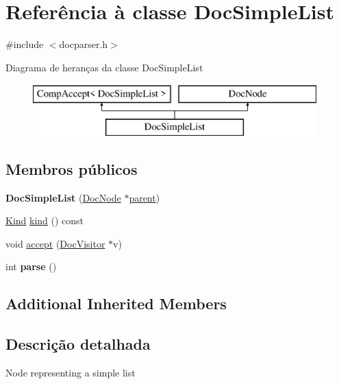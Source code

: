 \hypertarget{class_doc_simple_list}{\section{Referência à classe Doc\-Simple\-List}
\label{class_doc_simple_list}
}


{\ttfamily \#include $<$docparser.\-h$>$}

Diagrama de heranças da classe Doc\-Simple\-List\begin{figure}[H]
\begin{center}
\leavevmode
\includegraphics[height=2.000000cm]{class_doc_simple_list}
\end{center}
\end{figure}
\subsection*{Membros públicos}
\begin{DoxyCompactItemize}
\item 
\hypertarget{class_doc_simple_list_aad6ef0004fe01a0c5b70711f1f0f8701}{{\bfseries Doc\-Simple\-List} (\hyperlink{class_doc_node}{Doc\-Node} $\ast$\hyperlink{class_doc_node_abd7f070d6b0a38b4da71c2806578d19d}{parent})}\label{class_doc_simple_list_aad6ef0004fe01a0c5b70711f1f0f8701}

\item 
\hyperlink{class_doc_node_aa10c9e8951b8ccf714a59ec321bdac5b}{Kind} \hyperlink{class_doc_simple_list_aa9d037bed9f9a083d0cd01485637d843}{kind} () const 
\item 
void \hyperlink{class_doc_simple_list_a7ba716e854ae2f8f87a4eb2140e302b6}{accept} (\hyperlink{class_doc_visitor}{Doc\-Visitor} $\ast$v)
\item 
\hypertarget{class_doc_simple_list_a67007fc2be130666fbf3b065022756f4}{int {\bfseries parse} ()}\label{class_doc_simple_list_a67007fc2be130666fbf3b065022756f4}

\end{DoxyCompactItemize}
\subsection*{Additional Inherited Members}


\subsection{Descrição detalhada}
Node representing a simple list 

